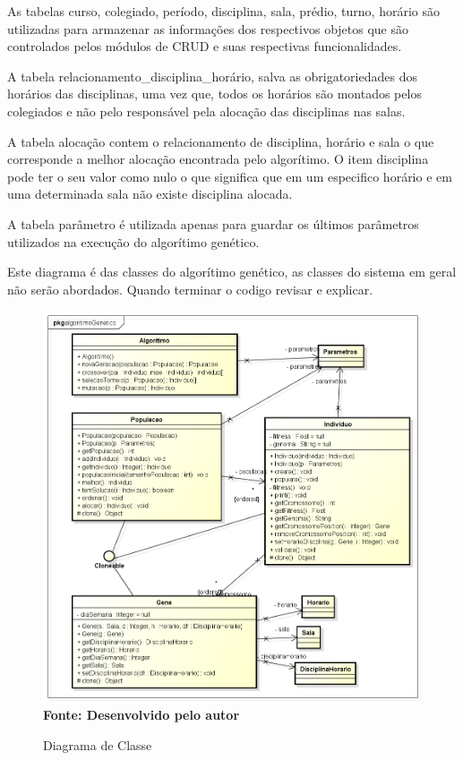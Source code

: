 As tabelas curso, colegiado, período, disciplina, sala, prédio, turno, horário são utilizadas para armazenar as informações dos respectivos objetos que são controlados pelos módulos de CRUD e suas respectivas funcionalidades.\par

A tabela relacionamento\_disciplina\_horário, salva as obrigatoriedades dos horários das disciplinas, uma vez que, todos os horários são montados pelos colegiados e não pelo responsável pela alocação das disciplinas nas salas.\par

A tabela alocação contem o relacionamento de disciplina, horário e sala o que corresponde a melhor alocação encontrada pelo algorítimo. O item disciplina pode ter o seu valor como nulo o que significa que em um especifico horário e em uma determinada sala não existe disciplina alocada.\par

A tabela parâmetro é utilizada apenas para guardar os últimos parâmetros utilizados na execução do algorítimo genético.\par



Este diagrama é das classes do algorítimo genético, as classes do sistema em geral não serão abordados. Quando terminar o codigo revisar e explicar.\par

\begin{figure}[!htb]
\caption[Diagrama de Classe]{Diagrama de Classe}
\label{fig:figura3}
\centering
\includegraphics[scale=0.5]{imagens/diagramaClasse.png}
\\ \textbf{\footnotesize Fonte: Desenvolvido pelo autor}
\end{figure}

